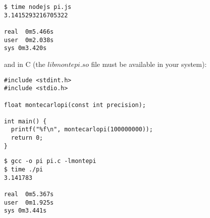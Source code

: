 \begin{verbatim}
$ time nodejs pi.js 
3.1415293216705322

real  0m5.466s
user  0m2.038s
sys 0m3.420s
\end{verbatim}

and in C (the $libmontepi.so$ file must be available in your system):

\begin{lstlisting}[label=ccorl,caption=C calling our Rust library]
#include <stdint.h>
#include <stdio.h>

float montecarlopi(const int precision);

int main() {
  printf("%f\n", montecarlopi(100000000));
  return 0;
}
\end{lstlisting}

\begin{verbatim}
$ gcc -o pi pi.c -lmontepi
$ time ./pi 
3.141783

real  0m5.367s
user  0m1.925s
sys 0m3.441s
\end{verbatim}
